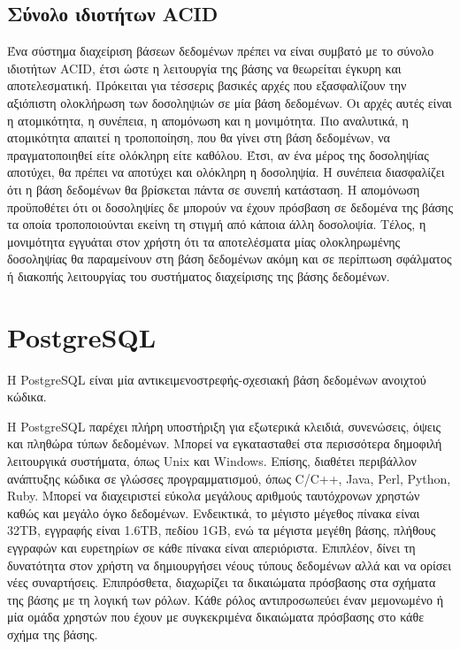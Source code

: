 \documentclass[diploma]{softlab-thesis}
\begin{document}
\subsection{Σύνολο ιδιοτήτων ACID}

Ένα σύστημα διαχείριση βάσεων δεδομένων πρέπει να είναι συμβατό με το σύνολο ιδιοτήτων ACID, έτσι ώστε η λειτουργία της βάσης να θεωρείται έγκυρη και αποτελεσματική. 
Πρόκειται για τέσσερις βασικές αρχές που εξασφαλίζουν την αξιόπιστη ολοκλήρωση των δοσοληψιών σε μία βάση δεδομένων. Οι αρχές αυτές είναι η ατομικότητα, η συνέπεια, 
η απομόνωση και η μονιμότητα. Πιο αναλυτικά, η ατομικότητα απαιτεί η τροποποίηση, που θα γίνει στη βάση δεδομένων, να πραγματοποιηθεί είτε ολόκληρη είτε καθόλου. 
Έτσι, αν ένα μέρος της δοσοληψίας αποτύχει, θα πρέπει να αποτύχει και ολόκληρη η δοσοληψία. Η συνέπεια διασφαλίζει ότι η βάση δεδομένων θα βρίσκεται πάντα σε συνεπή κατάσταση. 
Η απομόνωση προϋποθέτει ότι οι δοσοληψίες δε μπορούν να έχουν πρόσβαση σε δεδομένα της βάσης τα οποία τροποποιούνται εκείνη τη στιγμή από κάποια άλλη δοσολοψία. 
Τέλος, η μονιμότητα εγγυάται στον χρήστη ότι τα αποτελέσματα μίας ολοκληρωμένης δοσοληψίας θα παραμείνουν στη βάση δεδομένων ακόμη και σε περίπτωση σφάλματος ή 
διακοπής λειτουργίας του συστήματος διαχείρισης της βάσης δεδομένων. 


\section{PostgreSQL}

Η PostgreSQL είναι μία αντικειμενοστρεφής-σχεσιακή βάση δεδομένων ανοιχτού κώδικα. 
 

Η PostgreSQL παρέχει πλήρη υποστήριξη για εξωτερικά κλειδιά, συνενώσεις, όψεις και πληθώρα τύπων δεδομένων. Μπορεί να εγκατασταθεί στα περισσότερα δημοφιλή 
λειτουργικά συστήματα, όπως Unix και Windows. Επίσης, διαθέτει περιβάλλον ανάπτυξης κώδικα σε γλώσσες προγραμματισμού, όπως C/C++, Java, Perl, Python, Ruby. 
Μπορεί να διαχειριστεί εύκολα μεγάλους αριθμούς ταυτόχρονων χρηστών καθώς και μεγάλο όγκο δεδομένων. Ενδεικτικά, το μέγιστο μέγεθος πίνακα είναι 32ΤΒ, 
εγγραφής είναι 1.6ΤΒ, πεδίου 1GB, ενώ τα μέγιστα μεγέθη βάσης, πλήθους εγγραφών και ευρετηρίων σε κάθε πίνακα είναι απεριόριστα. Επιπλέον, δίνει τη δυνατότητα στον 
χρήστη να δημιουργήσει νέους τύπους δεδομένων αλλά και να ορίσει νέες συναρτήσεις. Επιπρόσθετα, διαχωρίζει τα δικαιώματα πρόσβασης στα σχήματα της βάσης με τη λογική 
των ρόλων. Κάθε ρόλος αντιπροσωπεύει έναν μεμονωμένο ή μία ομάδα χρηστών που έχουν με συγκεκριμένα δικαιώματα πρόσβασης στο κάθε σχήμα της βάσης. 
\end{document}
